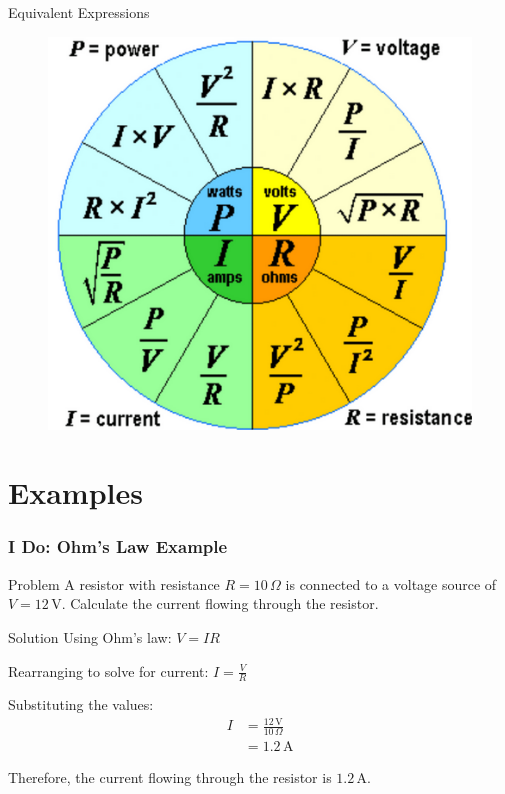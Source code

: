 \documentclass{beamer}
\begin{document}
\begin{frame}
\begin{alertblock}{Equivalent Expressions}
\begin{figure}
    \centering
    \includegraphics[width=0.7\linewidth]{pvri.png}
\end{figure}
\end{alertblock}
\end{frame}

\section{Examples}

\begin{frame}
\frametitle{I Do: Ohm's Law Example}
\begin{exampleblock}{Problem}
A resistor with resistance $R = 10 \, \Omega$ is connected to a voltage source of $V = 12 \, \text{V}$. Calculate the current flowing through the resistor.
\end{exampleblock}
\pause
\begin{block}{Solution}
Using Ohm's law: $V = IR$

Rearranging to solve for current: $I = \frac{V}{R}$

Substituting the values:
\begin{align}
I &= \frac{12 \, \text{V}}{10 \, \Omega} \\
&= 1.2 \, \text{A}
\end{align}

Therefore, the current flowing through the resistor is $1.2 \, \text{A}$.
\end{block}
\end{frame}
\end{document}
